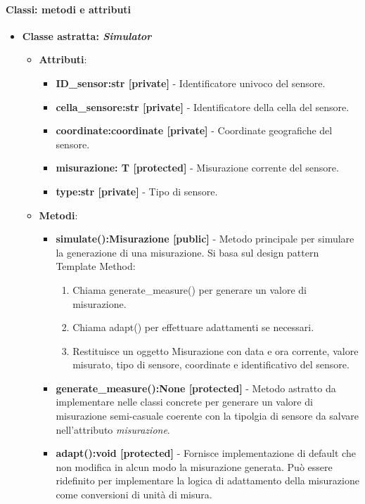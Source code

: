 \paragraph{Classi: metodi e attributi}
\begin{itemize}
    \item {\textbf{Classe astratta: \textit{Simulator}}}
        \begin{itemize}
            \item \textbf{Attributi}: 
            \begin{itemize}
                \item \textbf{ID\_sensor:str [private]} - Identificatore univoco del sensore.
                \item \textbf{cella\_sensore:str [private]} - Identificatore della cella del sensore.
                \item \textbf{coordinate:coordinate [private]} - Coordinate geografiche del sensore.
                \item \textbf{misurazione: T [protected]} - Misurazione corrente del sensore.
                \item \textbf{type:str [private]} - Tipo di sensore.
            \end{itemize}
            \item \textbf{Metodi}:
            \begin{itemize}
                \item \textbf{simulate():Misurazione [public]} - Metodo principale per simulare la generazione di una misurazione.
                Si basa sul design pattern Template Method:
                \begin{enumerate}
                    \item     Chiama generate\_measure() per generare un valore di misurazione.
                    \item     Chiama adapt() per effettuare adattamenti se necessari.
                    \item     Restituisce un oggetto Misurazione con data e ora corrente, valore misurato, tipo di sensore, coordinate e identificativo del sensore.
                \end{enumerate}
                \item \textbf{generate\_measure():None [protected]} - Metodo astratto da implementare nelle classi concrete per generare un valore di misurazione semi-casuale coerente con la tipolgia di sensore da salvare nell'attributo \textit{misurazione}.
                \item \textbf{adapt():void [protected]} - Fornisce implementazione di default che non modifica in alcun modo la misurazione generata. Può essere ridefinito per implementare la logica di adattamento della misurazione come conversioni di unità di misura.

\end{itemize}
\end{itemize}
\end{itemize}
